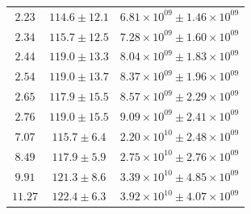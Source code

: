 \documentclass{article}
\begin{document}
\begin{table}[h!]
\begin{tabular}{|c|c|c|}
        $2.23$ & $114.6 \pm 12.1$ & $6.81\times 10^{09} \pm 1.46\times 10^{09}$ \\
        $2.34$ & $115.7 \pm 12.5$ & $7.28\times 10^{09} \pm 1.60\times 10^{09}$ \\
        $2.44$ & $119.0 \pm 13.3$ & $8.04\times 10^{09} \pm 1.83\times 10^{09}$ \\
        $2.54$ & $119.0 \pm 13.7$ & $8.37\times 10^{09} \pm 1.96\times 10^{09}$ \\
        $2.65$ & $117.9 \pm 15.5$ & $8.57\times 10^{09} \pm 2.29\times 10^{09}$ \\
        $2.76$ & $119.0 \pm 15.5$ & $9.09\times 10^{09} \pm 2.41\times 10^{09}$ \\
        $7.07$ & $115.7 \pm 6.4$ & $2.20\times 10^{10} \pm 2.48\times 10^{09}$ \\
        $8.49$ & $117.9 \pm 5.9$ & $2.75\times 10^{10} \pm 2.76\times 10^{09}$ \\
        $9.91$ & $121.3 \pm 8.6$ & $3.39\times 10^{10} \pm 4.85\times 10^{09}$ \\
        $11.27$ & $122.4 \pm 6.3$ & $3.92\times 10^{10} \pm 4.07\times 10^{09}$ \\
        \hline
    \end{tabular}
\end{table}
\end{document}
